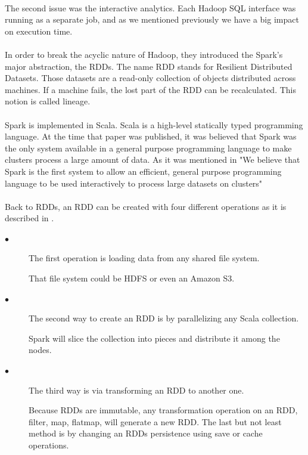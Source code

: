 \paragraph{}The second issue was the interactive analytics. Each Hadoop SQL interface was running as a separate job, and as we mentioned previously we have a big impact on execution time.

\paragraph{}In order to break the acyclic nature of Hadoop, they introduced the Spark's major abstraction, the RDDs. The name RDD stands for Resilient Distributed Datasets. Those datasets are a read-only collection of objects distributed across machines. If a machine fails, the lost part of the RDD can be recalculated. This notion is called lineage.

\paragraph{}Spark is implemented in Scala. Scala is a high-level statically typed programming language. At the time that paper was published, it was believed that Spark was the only system available in a general purpose programming language to make clusters process a large amount of data. As it was mentioned in \cite{Zaharia:2010:SCC:1863103.1863113} "We believe that Spark is the first system to allow an efficient, general purpose programming language to be used interactively to process large datasets on clusters"

\paragraph{}Back to RDDs, an RDD can be created with four different operations as it is described in \cite{Zaharia:2010:SCC:1863103.1863113}.

\begin{description}
	\item[$\bullet$] The first operation is loading data from any shared file system. 
	
	That file system could be HDFS or even an Amazon S3. 
	\item[$\bullet$] The second way to create an RDD is by parallelizing any Scala collection. 
	
	Spark will slice the collection into pieces and distribute it among the nodes.
	\item[$\bullet$] The third way is via transforming an RDD to another one. 
	
	Because RDDs are immutable, any transformation operation on an RDD, filter, map, flatmap, will generate a new RDD. The last but not least method is by changing an RDDs persistence using save or cache operations.
\end{description}


